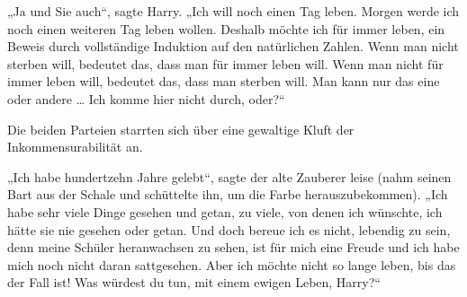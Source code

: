 „Ja und Sie auch“, sagte Harry.
„Ich will noch einen Tag leben. Morgen werde ich noch einen weiteren Tag leben wollen. Deshalb möchte ich für immer leben, ein Beweis durch vollständige Induktion auf den natürlichen Zahlen. Wenn man nicht sterben will, bedeutet das, dass man für immer leben will. Wenn man nicht für immer leben will, bedeutet das, dass man sterben will. Man kann nur das eine oder andere … Ich komme hier nicht durch, oder?“

Die beiden Parteien starrten sich über eine gewaltige Kluft der Inkommensurabilität an.%

„Ich habe hundertzehn Jahre gelebt“, sagte der alte Zauberer leise (nahm seinen Bart aus der Schale und schüttelte ihn, um die Farbe herauszubekommen).
„Ich habe sehr viele Dinge gesehen und getan, zu viele, von denen ich wünschte, ich hätte sie nie gesehen oder getan. Und doch bereue ich es nicht, lebendig zu sein, denn meine Schüler heranwachsen zu sehen, ist für mich eine Freude und ich habe mich noch nicht daran sattgesehen. Aber ich möchte nicht so lange leben, bis das der Fall ist! Was würdest du tun, mit einem ewigen Leben, Harry?“

